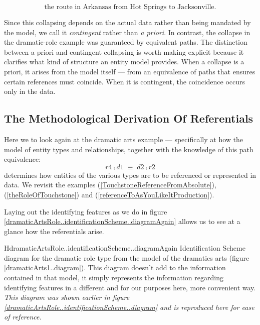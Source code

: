\begin{equation*}
\text{the route in Arkansas from Hot Springs to Jacksonville.}
\end{equation*}

Since this collapsing depends on the actual data rather than being mandated by the model, we call it \textit{contingent} rather than \textit{a priori}. In contrast, the collapse in the dramatic-role example was guaranteed by equivalent paths. The distinction between a priori and contingent collapsing is worth making explicit because it clarifies what kind of structure an entity model provides. When a collapse is a priori, it arises from the model itself — from an equivalence of paths that ensures certain references must coincide. When it is contingent, the coincidence occurs only in the data.


\subsection{The Methodological Derivation Of Referentials}

Here we to look again at the dramatic arts example --- specifically at how the model of entity types and relationships,
together with the knowledge of this path equivalence:
\begin{equation}
\label{playedBy.Scope.asEquivalence}
r4 \comp d1 \;\equiv\; d2 \comp r2
\end{equation}
determines how entities
of the various types are to be referenced or represented in data. 
We revisit the examples (\ref{TouchstoneReferenceFromAbsolute}), (\ref{theRoleOfTouchstone}) and (\ref{referenceToAsYouLikeItProduction}).

Laying out the identifying features as we do in figure \ref{dramaticArtsRole..identificationScheme..diagramAgain} allows us
to see at a glance how the referentials arise.

\begin{erboxedFigure}{H}{dramaticArtsRole..identificationScheme..diagramAgain}
{Identification Scheme diagram for the dramatic role type
from the model of the dramatics arts (figure \ref{dramaticArts1..diagram}). This diagram doesn't add to the information
contained in that model, it simply represents the information regarding identifying features in a  different
 and for our purposes here, more convenient way. \textit{This diagram was shown earlier
in figure \ref{dramaticArtsRole..identificationScheme..diagram} and is reproduced here for ease of reference.}
} %
\begin{equation*}

\end{equation*}
\end{erboxedFigure}


